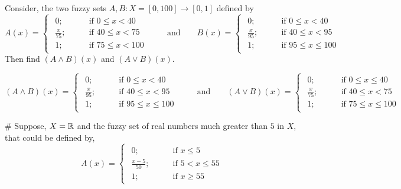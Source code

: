 \documentclass[../main-sheet.tex]{subfiles}
\begin{document}
\begin{prob}
    Consider, the two fuzzy sets \(A,B:X=[0,100]\to[0,1]\) defined by
    \[
        A(x)=\begin{cases}
            \begin{aligned}
                0; \qquad&\text{if } 0\leq x< 40\\
                \frac{x}{75}; \qquad&\text{if }40\leq x<75\\
                1; \qquad&\text{if }75\leq x<100
            \end{aligned}
    \end{cases}
    \qquad\text{and}\qquad
    B(x)=\begin{cases}
        \begin{aligned}
            0; \qquad&\text{if }0\leq x< 40\\
            \frac{x}{95}; \qquad&\text{if }40\leq x<95\\
            1; \qquad&\text{if }95\leq x\leq 100
        \end{aligned}
    \end{cases}
    \]
    Then find \((A\wedge B)(x )\) and \((A\vee B )(x )\).
\end{prob}
\begin{soln}
    \[
        (A\wedge B)(x)=\begin{cases}
            \begin{aligned}
                0; \qquad&\text{if } 0\leq x< 40\\
                \frac{x}{95}; \qquad&\text{if }40\leq x<95\\
                1; \qquad&\text{if }95\leq x\leq 100
            \end{aligned}
    \end{cases}
    \qquad\text{and}\qquad
    (A\vee B)(x)=\begin{cases}
        \begin{aligned}
            0; \qquad&\text{if }0\leq x\leq 40\\
            \frac{x}{75}; \qquad&\text{if }40\leq x<75\\
            1; \qquad&\text{if }75\leq x\leq 100
        \end{aligned}
    \end{cases}
    \]
\end{soln}
\# Suppose, \(X=\mathbb{R} \) and the fuzzy set of real numbers much greater than \(5\) in \(X \), that could be defined by,
\[
    A(x)=\begin{cases}
        \begin{aligned}
            0; \qquad&\text{if } x\leq 5\\
            \frac{x-5}{50}; \qquad&\text{if }5< x\leq 55\\
            1; \qquad&\text{if }x\geq 55
        \end{aligned}
\end{cases}
\]
\end{document}
